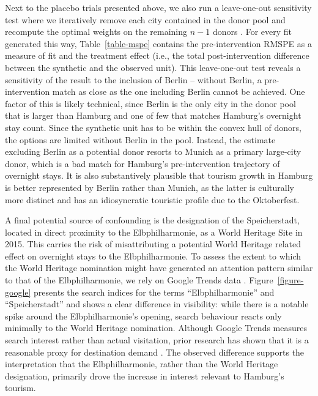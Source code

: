 \documentclass[a4paper, 12pt]{article}
\begin{document}
Next to the placebo trials presented above, we also run a leave-one-out sensitivity test where we iteratively remove each city contained in the donor pool and recompute the optimal weights on the remaining $n - 1$ donors \citep{abadie2015}. For every fit generated this way, Table~\ref{table-mspe} contains the pre-intervention RMSPE as a measure of fit and the treatment effect (i.e., the total post-intervention difference between the synthetic and the observed unit). This leave-one-out test reveals a sensitivity of the result to the inclusion of Berlin -- without Berlin, a pre-intervention match as close as the one including Berlin cannot be achieved. One factor of this is likely technical, since Berlin is the only city in the donor pool that is larger than Hamburg and one of few that matches Hamburg's overnight stay count. Since the synthetic unit has to be within the convex hull of donors, the options are limited without Berlin in the pool. Instead, the estimate excluding Berlin as a potential donor resorts to Munich as a primary large-city donor, which is a bad match for Hamburg's pre-intervention trajectory of overnight stays. It is also substantively plausible that tourism growth in Hamburg is better represented by Berlin rather than Munich, as the latter is culturally more distinct and has an idiosyncratic touristic profile due to the Oktoberfest.

A final potential source of confounding is the designation of the Speicherstadt, located in direct proximity to the Elbphilharmonie, as a World Heritage Site in 2015. This carries the risk of misattributing a potential World Heritage related effect on overnight stays to the Elbphilharmonie. To assess the extent to which the World Heritage nomination might have generated an attention pattern similar to that of the Elbphilharmonie, we rely on Google Trends data \citep{googletrends}. Figure~\ref{figure-google} presents the search indices for the terms ``Elbphilharmonie'' and ``Speicherstadt'' and shows a clear difference in visibility: while there is a notable spike around the Elbphilharmonie's opening, search behaviour reacts only minimally to the World Heritage nomination. Although Google Trends measures search interest rather than actual visitation, prior research has shown that it is a reasonable proxy for destination demand \citep{dinis2019, onder2017, botha2024}. The observed difference supports the interpretation that the Elbphilharmonie, rather than the World Heritage designation, primarily drove the increase in interest relevant to Hamburg's tourism.
\end{document}
